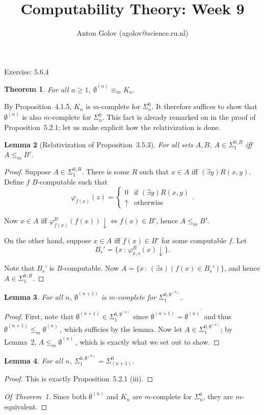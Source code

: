\documentclass{article}
\title{Computability Theory: Week 9}
\author{Anton Golov (agolov@science.ru.nl)}
\newtheorem{theorem}{Theorem}
\newtheorem{lemma}[theorem]{Lemma}
\newcommand{\compr}[2]{\{ #1 \,:\, #2 \}}
\newcommand{\terminates}{\!\!\downarrow}
\newcommand{\njump}{\emptyset^{(n)}}
\newcommand{\njumpprime}{\emptyset^{(n)^\prime}}
\newcommand{\snjump}{\emptyset^{(n+1)}}
\begin{document}
  \maketitle

  Exercise: 5.6.4

  \begin{theorem}
    For all $n \ge 1$, $\njump \equiv_m K_n$.
  \end{theorem}

  By Proposition~4.1.5, $K_n$ is $m$-complete for $\Sigma^0_n$.  It therefore suffices to show that $\njump$ is
  also $m$-complete for $\Sigma^0_n$.  This fact is already remarked on in the proof of Proposition~5.2.1; let us make
  explicit how the relativization is done.

  \begin{lemma}[Relativization of Proposition~3.5.3]
    For all sets $A, B$, $A \in \Sigma^{0, B}_1$ iff $A \le_m B'$.
  \end{lemma}

  \begin{proof}
    Suppose $A \in \Sigma^{0, B}_1$.  There is some $R$ such that $x \in A$ iff $(\exists y) R(x, y)$.  Define $f$
    $B$-computable such that
    \[
      \varphi_{f(x)}(z) =
      \begin{cases}
        0 & \text{if $(\exists y) R(x, y)$}\\
        \uparrow & \text{otherwise}
      \end{cases}
    .\]

    Now $x \in A$ iff $\varphi^B_{f(x)}(f(x))\terminates \iff f(x) \in B'$, hence $A \le_m B'$.

    On the other hand, suppose $x \in A$ iff $f(x) \in B'$ for some computable $f$.  Let
    \[
      B_s' = \compr{x}{\varphi^B_{x, s}(x)\terminates}.
    \]

    Note that $B_s'$ is $B$-computable.  Now $A = \compr{x}{(\exists s)(f(x) \in B_s')}$, and hence $A \in \Sigma^{0, B}_1$.
  \end{proof}

  \begin{lemma}
    For all $n$, $\snjump$ is $m$-complete for $\Sigma^{0, \njump}_1$.
  \end{lemma}

  \begin{proof}
    First, note that $\snjump \in \Sigma^{0, \njump}_1$ since $\snjump = \njumpprime$ and thus $\snjump \le_m
    \njumpprime$, which sufficies by the lemma.  Now let $A \in \Sigma^{0, \njump}_1$; by Lemma~2, $A \le_m \njumpprime$,
    which is exactly what we set out to show.
  \end{proof}

  \begin{lemma}
    For all $n$, $\Sigma^{0, \njump}_1 = \Sigma^0_{(n+1)}$.
  \end{lemma}

  \begin{proof}
    This is exactly Proposition~5.2.1 (iii).
  \end{proof}

  \begin{proof}[Of Theorem~1]
    Since both $\njump$ and $K_n$ are $m$-complete for $\Sigma^0_n$, they are $m$-equivalent.
  \end{proof}
\end{document}
